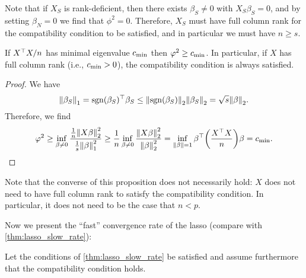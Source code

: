 Note that if $X_S$ is rank-deficient, then there exists  $\beta_S \neq 0$ with $X_S\beta_S = 0$, and by setting $\beta_N = 0$ we find that $\phi^2 = 0$. Therefore, $X_S$ must have full column rank for the compatibility condition to be satisfied, and in particular we must have $n \geq s$. 

\begin{proposition}
	If $X^\top X/n$ has minimal eigenvalue $c_\mathrm{min}$ then $\varphi^2 \geq c_\mathrm{min}$. In particular, if $X$ has full column rank (i.e., $c_\mathrm{min} > 0$), the compatibility condition is always satisfied. 
\end{proposition}

\begin{proof}
	We have
	\[
	\norm{\beta_S}_1 = \operatorname{sgn}(\beta_S)^\top \beta_S\leq \norm{\operatorname{sgn}(\beta_S)}_2 \norm{\beta_S}_2 = \sqrt{s} \norm{\beta}_2.
	\]
	Therefore, we find
	\[
	\varphi^2 \geq \inf_{\beta \neq 0}  \frac{\frac1n \norm{X\beta}_2^2}{\frac1s \norm{\beta}_1^2} \geq \frac1n \inf_{\beta \neq 0} \frac{\norm{X\beta}_2^2}{\norm{\beta}_2^2} = \inf_{\norm{\beta} =1 } \beta^\top \qty(\frac{X^\top X}{n}) \beta = c_\mathrm{min}. 
	\]
\end{proof}

Note that the converse of this proposition does not necessarily hold: $X$ does not need to have full column rank to satisfy the compatibility condition. In particular, it does not need to be the case that $n < p$. 

Now we present the ``fast'' convergence rate of the lasso (compare with \cref{thm:lasso_slow_rate}):
\begin{theorem} \label{thm:lasso_fast_rate}
	Let the conditions of \cref{thm:lasso_slow_rate} be satisfied and assume furthermore that the compatibility condition holds. 
\end{theorem}